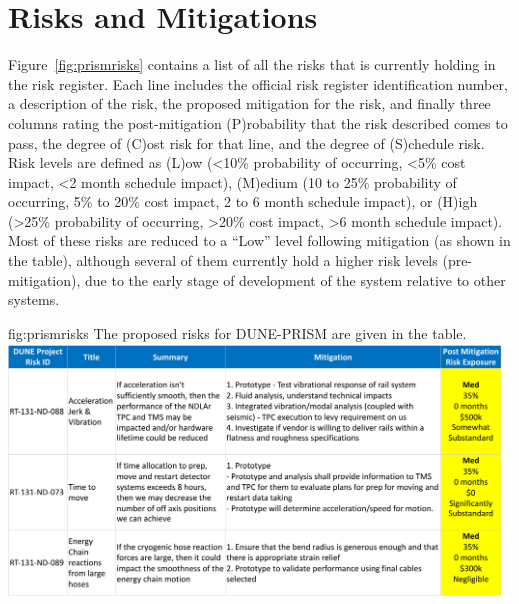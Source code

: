 \section{Risks and Mitigations}
\label{sec:prism-risks}

Figure~\ref{fig:prismrisks} contains a list of all the
risks that  is currently holding in the  risk register.  Each line includes the official  risk register identification number, a description of the risk, the proposed mitigation for the risk, and finally three columns rating the post-mitigation (P)robability that the risk described comes to pass, the degree of (C)ost risk for that line, and the degree of (S)chedule risk.  Risk levels are defined as (L)ow (<10\% probability of occurring, <5\% cost impact, <2 month schedule impact), (M)edium (10 to 25\% probability of occurring, 5\% to 20\% cost impact, 2 to 6 month schedule impact), or (H)igh (>25\% probability of occurring, >20\% cost impact, >6 month schedule impact).  Most of these risks are reduced to a ``Low'' level following mitigation (as shown in the table), although several of them currently hold a higher risk levels (pre-mitigation), due to the early stage of development of the  system relative to other systems.  



\begin{dunefigure}{fig:prismrisks}
{The proposed risks for DUNE-PRISM are given in the table.}
\includegraphics[width=0.98\textwidth]{graphics/prism/prismrisks.pdf}
\end{dunefigure}


